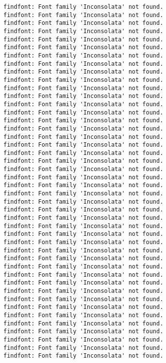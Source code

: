 \documentclass[11pt]{article}
\begin{document}
    \begin{Verbatim}[commandchars=\\\{\}]
findfont: Font family 'Inconsolata' not found.
findfont: Font family 'Inconsolata' not found.
findfont: Font family 'Inconsolata' not found.
findfont: Font family 'Inconsolata' not found.
findfont: Font family 'Inconsolata' not found.
findfont: Font family 'Inconsolata' not found.
findfont: Font family 'Inconsolata' not found.
findfont: Font family 'Inconsolata' not found.
findfont: Font family 'Inconsolata' not found.
findfont: Font family 'Inconsolata' not found.
findfont: Font family 'Inconsolata' not found.
findfont: Font family 'Inconsolata' not found.
findfont: Font family 'Inconsolata' not found.
findfont: Font family 'Inconsolata' not found.
findfont: Font family 'Inconsolata' not found.
findfont: Font family 'Inconsolata' not found.
findfont: Font family 'Inconsolata' not found.
findfont: Font family 'Inconsolata' not found.
findfont: Font family 'Inconsolata' not found.
findfont: Font family 'Inconsolata' not found.
findfont: Font family 'Inconsolata' not found.
findfont: Font family 'Inconsolata' not found.
findfont: Font family 'Inconsolata' not found.
findfont: Font family 'Inconsolata' not found.
findfont: Font family 'Inconsolata' not found.
findfont: Font family 'Inconsolata' not found.
findfont: Font family 'Inconsolata' not found.
findfont: Font family 'Inconsolata' not found.
findfont: Font family 'Inconsolata' not found.
findfont: Font family 'Inconsolata' not found.
findfont: Font family 'Inconsolata' not found.
findfont: Font family 'Inconsolata' not found.
findfont: Font family 'Inconsolata' not found.
findfont: Font family 'Inconsolata' not found.
findfont: Font family 'Inconsolata' not found.
findfont: Font family 'Inconsolata' not found.
findfont: Font family 'Inconsolata' not found.
findfont: Font family 'Inconsolata' not found.
findfont: Font family 'Inconsolata' not found.
findfont: Font family 'Inconsolata' not found.
findfont: Font family 'Inconsolata' not found.
findfont: Font family 'Inconsolata' not found.
findfont: Font family 'Inconsolata' not found.
findfont: Font family 'Inconsolata' not found.
    \end{Verbatim}

    \begin{center}
    \end{center}
    { \hspace*{\fill} \\}
    
\end{document}
